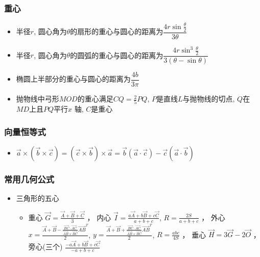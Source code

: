 \documentclass[landscape,a4paper]{article}
\begin{document}
\begin{spacing}{0.3}
\begin{multicols}{2}
\subsubsection{重心}
\begin{itemize}
\item 半径$r$, 圆心角为$\theta$的扇形的重心与圆心的距离为$\dfrac{4r\sin\frac{\theta}{2}}{3\theta}$
\item 半径$r$, 圆心角为$\theta$的圆弧的重心与圆心的距离为$\dfrac{4r\sin^3\frac{\theta}{2}}{3(\theta - \sin\theta)}$
\item 椭圆上半部分的重心与圆心的距离为$\dfrac{4b}{3\pi}$
\item  抛物线中弓形$MOD$的重心满足$CQ = \frac{2}{5} PQ$, $P$是直线$L$与抛物线的切点, $Q$在$MD$上且$PQ$平行$x$ 轴, $C$是重心
\end{itemize}

\subsubsection{向量恒等式}
\begin{itemize}
\item $\overrightarrow{a} \times (\overrightarrow{b} \times \overrightarrow{c}) = (\overrightarrow{c} \times \overrightarrow{b}) \times \overrightarrow{a} = \overrightarrow{b}(\overrightarrow{a} \cdot \overrightarrow{c}) - \overrightarrow{c}(\overrightarrow{a} \cdot \overrightarrow{b})$
\end{itemize}

\subsubsection{常用几何公式}
\begin{itemize}
\item 三角形的五心
  \begin{itemize}
  \item 重心 $\overrightarrow{G} = \frac{\overrightarrow{A} + \overrightarrow{B} + \overrightarrow{C}}{3}$
  ，
    内心 $\overrightarrow{I} = \frac{a\overrightarrow{A} + b\overrightarrow{B} + c\overrightarrow{C}}{a + b + c}$,
    $R = \frac{2S}{a + b + c}$
  ，
    外心
    $x = \frac{\overrightarrow{A} + \overrightarrow{B} - \frac{\overrightarrow{BC} \cdot \overrightarrow{AC}}{\overrightarrow{AB} \times \overrightarrow{BC}} \overrightarrow{AB}^{T}}{2}$,
    $y = \frac{\overrightarrow{A} + \overrightarrow{B} + \frac{\overrightarrow{BC} \cdot \overrightarrow{AC}}{\overrightarrow{AB} \times \overrightarrow{BC}} \overrightarrow{AB}^{T}}{2}$,
    $R = \frac{abc}{4S}$
  ，
    垂心 $\overrightarrow{H} = 3\overrightarrow{G} - 2\overrightarrow{O}$
  ，
    旁心(三个) $\frac{-a\overrightarrow{A} + b\overrightarrow{B} + c\overrightarrow{C}}{-a + b + c}$
  \end{itemize}
\end{itemize}


\end{multicols}
\end{spacing}
\end{document}
